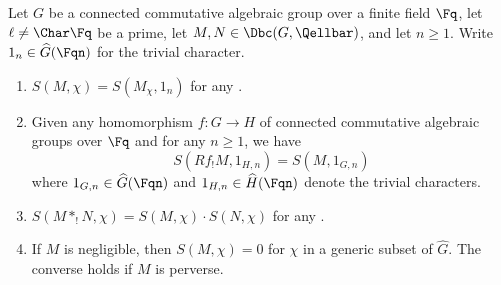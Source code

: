 \begin{proposition} \label{proposition:some_properties_of_the_arithmetic_fourier_transform}
Let $G$ be a connected commutative algebraic group over a finite field $\Fq$, let $\ell \neq \Char \Fq$ be a prime, let $M,N \in \Dbc(G, \Qellbar)$, and let $n \geq 1$. Write $1_n \in \widehat{G}(\Fqn)$ for the trivial character.

\begin{enumerate}
    \item $S(M, \chi) = S(M_\chi, 1_n)$ for any . 
    
    \item Given any homomorphism $f: G \to H$ of connected commutative algebraic groups over $\Fq$ and for any $n \geq 1$, we have 
    $$S(Rf_! M , 1_{H,n}) = S(M,1_{G,n})$$
    where $1_{G,n} \in \widehat{G}(\Fqn)$ and $1_{H,n} \in \widehat{H}(\Fqn)$ denote the trivial characters.

    \item $S(M *_! N, \chi) = S(M, \chi) \cdot S(N,\chi)$ for any . 

    \item If $M$ is negligible, then $S(M,\chi) = 0$ for $\chi$ in a generic subset of $\widehat{G}$. The converse holds if $M$ is perverse.
\end{enumerate}
\end{proposition}

